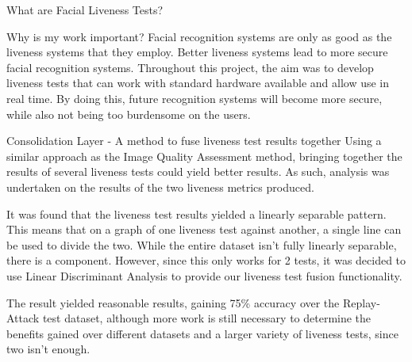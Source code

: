 \documentclass[final]{beamer}
\begin{document}
\begin{frame}{}
\begin{columns}[t]
\begin{column}{.48\linewidth}
\begin{block}{What are Facial Liveness Tests?}
        \end{block}
        \begin{block}{Why is my work important?}
          Facial recognition systems are only as good as the liveness systems that they employ. Better liveness systems lead to more secure facial recognition systems. Throughout this project, the aim was to develop liveness tests that can work with standard hardware available and allow use in real time. By doing this, future recognition systems will become more secure, while also not being too burdensome on the users. 
        \end{block}
        \begin{block}{Consolidation Layer - A method to fuse liveness test results together}
          Using a similar approach as the Image Quality Assessment method, bringing together the results of several liveness tests could yield
          better results. As such, analysis was undertaken on the results of the two liveness metrics produced.

          It was found that the liveness test results yielded a linearly separable pattern. This means that on a graph of one liveness test against another,
          a single line can be used to divide the two. While the entire dataset isn't fully linearly separable, there is a component. However, since this only works for 2 tests, it was decided to use
          Linear Discriminant Analysis to provide our liveness test fusion functionality.

          The result yielded reasonable results, gaining 75\% accuracy over the Replay-Attack test dataset, although more work is still necessary to determine the benefits gained over different datasets and a larger variety of liveness tests,
          since two isn't enough.
        \end{block}


\end{column}
\end{columns}
\end{frame}
\end{document}
